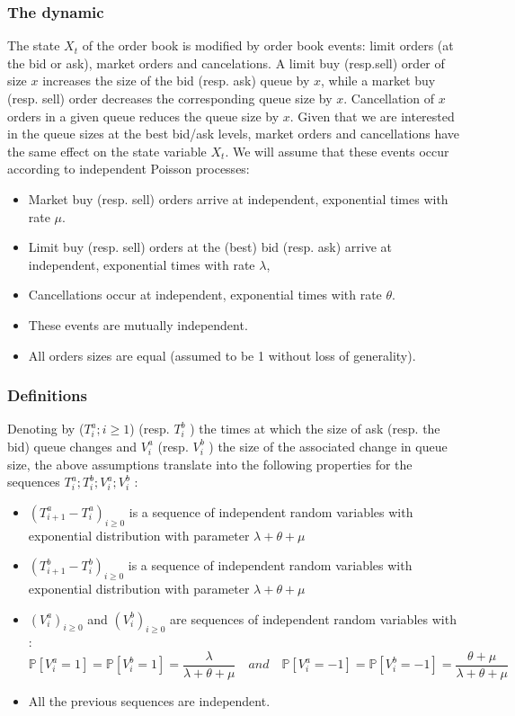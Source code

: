 \documentclass{article}
\begin{document}
\subsubsection{The dynamic}
The state $X_{t}$ of the order book is modified by order book events: limit orders (at the bid or ask),
market orders and cancelations. A limit buy (resp.sell) order of size $x$ increases the size of the bid (resp. ask) queue by $x$, while a market buy (resp. sell) order decreases the corresponding queue size by $x$. Cancellation of $x$ orders in a given queue reduces the queue size by $x$. Given that we are interested in the queue sizes at the best bid/ask levels, market orders and cancellations have the same effect on the state variable $X_{t}$.
We will assume that these events occur according to independent Poisson processes:
\begin{itemize}
\item Market buy (resp. sell) orders arrive at independent, exponential times with rate $\mu$.
\item Limit buy (resp. sell) orders at the (best) bid (resp. ask) arrive at independent, exponential
times with rate $\lambda$,
\item Cancellations occur at independent, exponential times with rate $\theta$.
\item These events are mutually independent.
\item All orders sizes are equal (assumed to be 1 without loss of generality).
\end{itemize}
\newpage 
\subsubsection{Definitions}
Denoting by ($T^{a}_i ; i \geq 1$) (resp. $T^{b}_i$ ) the times at which the size of ask (resp. the bid) queue changes
and $V^{a}_i$ (resp. $V^{b}_i$ ) the size of the associated change in queue size, the above assumptions translate
into the following properties for the sequences $T^{a}_i; T^{b}_i; V^{a}_i; V^{b}_i$ :
\begin{itemize}
\item $(T^{a}_{i+1} - T^{a}_i)_{i \geq 0}$ is a sequence of independent random variables with exponential distribution
with parameter $\lambda+\theta+\mu$

\item $(T^{b}_{i+1} - T^{b}_i)_{i \geq 0}$ is a sequence of independent random variables with exponential distribution
with parameter $\lambda+\theta+\mu$

\item $(V^{a}_i)_{i \geq 0}$ and $(V^{b}_i)_{i \geq 0}$ are sequences of independent random variables with :
\begin{equation}
\mathbb{P}[V^{a}_i = 1] = \mathbb{P}[V^{b}_i = 1]  = \frac{\lambda}{\lambda+\theta+\mu} \quad and \quad \mathbb{P}[V^{a}_i = -1] = \mathbb{P}[V^{b}_i = -1] = \frac{\theta+\mu}{\lambda+\theta+\mu}
\end{equation}

\item All the previous sequences are independent.
\end{itemize}
\end{document}
